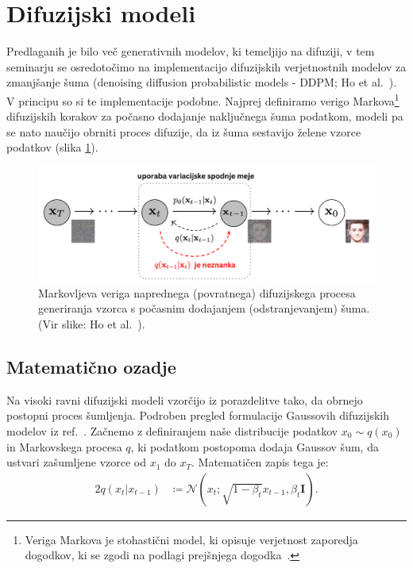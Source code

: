 \documentclass[12pt, a4paper]{article}
\begin{document}


\section{Difuzijski modeli}
\label{sec:Diffusion_Models}

Predlaganih je bilo več generativnih modelov, ki temeljijo na difuziji, v tem seminarju se osredotočimo na implementacijo difuzijskih verjetnostnih modelov za zmanjšanje šuma (denoising diffusion probabilistic models - DDPM; Ho et al.~\cite{DDPM}).
V principu so si te implementacije podobne. Najprej definiramo verigo Markova\footnote{Veriga Markova je stohastični model, ki opisuje verjetnost zaporedja dogodkov, ki se zgodi na podlagi prejšnjega dogodka~\cite{Markov-chain}.} difuzijskih korakov za počasno dodajanje naključnega šuma podatkom, modeli pa se nato naučijo obrniti proces difuzije, da iz šuma sestavijo želene vzorce podatkov (slika \ref{fig:forward-reverse-process}).
\begin{figure}[htb!]
        \centering
        \includegraphics[width=0.7\linewidth]{Images_SLO/DDPM Markov Chain_SLO.png}
        \caption{Markovljeva veriga naprednega (povratnega) difuzijskega procesa generiranja vzorca s počasnim dodajanjem (odstranjevanjem) šuma. (Vir slike: Ho et al.~\cite{DDPM}).}
        \label{fig:forward-reverse-process}
\end{figure}

\subsection{Matematično ozadje}

Na visoki ravni difuzijski modeli vzorčijo iz porazdelitve tako, da obrnejo postopni proces šumljenja. Podroben pregled formulacije Gaussovih difuzijskih modelov iz ref.~\cite{nonequilibrium-thermodynamics, DDPM, DMs-beat-GANs}. Začnemo z definiranjem naše distribucije podatkov $x_0 \sim q(x_0)$ in Markovskega procesa $q$, ki podatkom postopoma dodaja Gaussov šum, da ustvari zašumljene vzorce od $x_1$ do $x_T$. Matematičen zapis tega je:
%
\begin{alignat}{2}
q(x_t|x_{t-1}) &\coloneqq \mathcal{N}(x_t; \sqrt{1-\beta_t}x_{t-1}, \beta_t \mathbf{I}).
\end{alignat}
\end{document}
